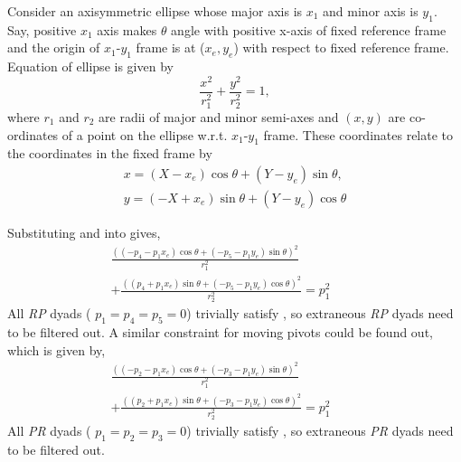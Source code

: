 Consider an axisymmetric ellipse whose major axis is  $x_1$ and minor axis is $y_1$. Say, positive $x_1$ axis makes $\theta$ angle with positive x-axis of fixed reference frame and the origin of $x_1$-$y_1$ frame is at ($x_e,y_e$) with respect to fixed reference frame. Equation of ellipse is given by
      \begin{equation}\label{ellipseEq}
        \frac{x^2}{r_1^2} + \frac{y^2}{r_2^2} = 1,
      \end{equation}
      where $r_1$ and $r_2$ are radii of major and minor semi-axes and $(x, y)$ are co-ordinates of a point on the ellipse w.r.t. $x_1$-$y_1$ frame. These coordinates relate to the coordinates in the fixed frame by
      \begin{equation}\label{transformation}
        \begin{array}{c}
          x = (X  - x_e)\cos \theta + (Y - y_e)\sin\theta, \\
          y = (-X+ x_e)\sin\theta + (Y - y_e)\cos \theta
        \end{array}
      \end{equation}

      Substituting   and  into   gives,
\begin{eqnarray}\label{ellipseFixedConstraintEq}
\frac{((-p_4-p_1x_e)\cos\theta+(-p_5-p_1y_e)\sin\theta)^2}{r_1^2} \hspace{2cm} \\\nonumber
+ \frac{((p_4+p_1x_e)\sin\theta+(-p_5- p_1y_e)\cos\theta)^2}{r_2^2} = p_1^2
\end{eqnarray}
All \emph{RP} dyads ( $p_1=p_4=p_5=0$) trivially satisfy , so extraneous \emph{RP} dyads need to be filtered out. A similar constraint for moving pivots could be found out, which is given by,
\begin{eqnarray}\label{ellipseMovingConstraintEq}
\frac{((-p_2-p_1x_e)\cos\theta+(-p_3-p_1y_e)\sin\theta)^2}{r_1^2} \hspace{2cm} \\\nonumber
+ \frac{((p_2+p_1x_e)\sin\theta+(-p_3- p_1y_e)\cos\theta)^2}{r_2^2} = p_1^2
\end{eqnarray}
All \emph{PR} dyads ( $p_1=p_2=p_3=0$) trivially satisfy , so extraneous \emph{PR} dyads need to be filtered out.

